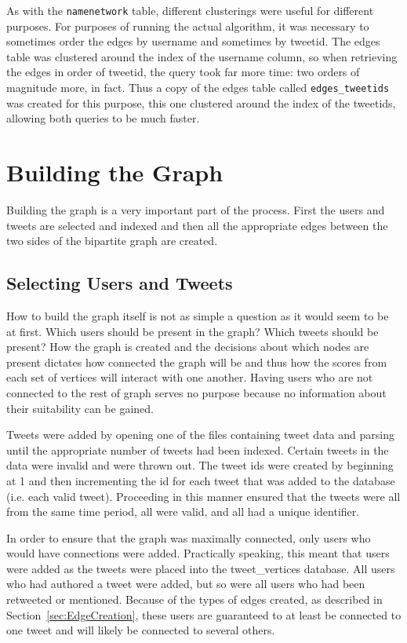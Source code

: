 As with the \texttt{namenetwork} table, different clusterings were useful for different purposes. For purposes of running the actual algorithm, it was necessary to sometimes order the edges by username and sometimes by tweetid. The edges table was clustered around the index of the username column, so when retrieving the edges in order of tweetid, the query took far more time: two orders of magnitude more, in fact. Thus a copy of the edges table called \texttt{edges\_tweetids} was created for this purpose, this one clustered around the index of the tweetids, allowing both queries to be much faster.

\section{Building the Graph}
\label{sec:BuildingTheGraph}

Building the graph is a very important part of the process. First the users and tweets are selected and indexed and then all the appropriate edges between the two sides of the bipartite graph are created.

\subsection{Selecting Users and Tweets}

How to build the graph itself is not as simple a question as it would seem to be at first. Which users should be present in the graph? Which tweets should be present? How the graph is created and the decisions about which nodes are present dictates how connected the graph will be and thus how the scores from each set of vertices will interact with one another. Having users who are not connected to the rest of graph serves no purpose because no information about their suitability can be gained.

Tweets were added by opening one of the files containing tweet data and parsing until the appropriate number of tweets had been indexed. Certain tweets in the data were invalid and were thrown out. The tweet ids were created by beginning at 1 and then incrementing the id for each tweet that was added to the database (i.e. each valid tweet). Proceeding in this manner ensured that the tweets were all from the same time period, all were valid, and all had a unique identifier.

In order to ensure that the graph was maximally connected, only users who would have connections were added. Practically speaking, this meant that users were added as the tweets were placed into the tweet\_vertices database. All users who had authored a tweet were added, but so were all users who had been retweeted or mentioned. Because of the types of edges created, as described in Section~\ref{sec:EdgeCreation}, these users are guaranteed to at least be connected to one tweet and will likely be connected to several others.


